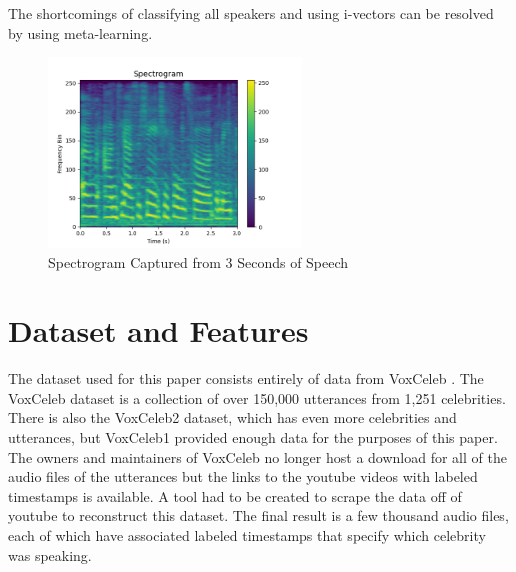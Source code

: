 \documentclass{article}
\begin{document}
The shortcomings of classifying all speakers and using i-vectors can be resolved by using meta-learning. 


\begin{figure}
  \centering
  \includegraphics[width=0.6\textwidth]{Images/spectrogram_example.png}
  \caption[]{Spectrogram Captured from 3 Seconds of Speech}
  \label{fig:SpectrogramExample}
\end{figure}

\section{Dataset and Features}
The dataset used for this paper consists entirely of data from VoxCeleb \cite{DBLP:journals/corr/NagraniCZ17}. The 
VoxCeleb dataset is a collection of over 150,000 utterances from 1,251 celebrities. There is also the VoxCeleb2 \cite{Chung18b} 
dataset, which has even more celebrities and utterances, but VoxCeleb1 provided enough data for the purposes of this paper.
The owners and maintainers of VoxCeleb no longer host a download for all of the audio files of the utterances but the 
links to the youtube videos with labeled timestamps is available. A tool had to be created to scrape the data off of
youtube to reconstruct this dataset. The final result is a few thousand audio files, each of which have associated labeled
timestamps that specify which celebrity was speaking.
\end{document}
